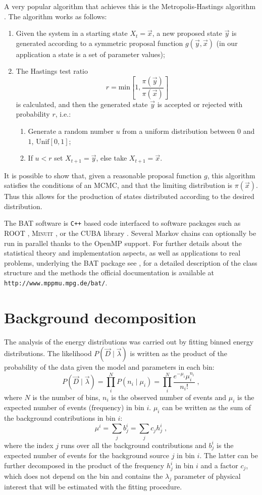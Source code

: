 A very popular algorithm that achieves this is the Metropolis-Hastings algorithm \cite{Metropolis,Hastings}. The algorithm works as follows:
\begin{enumerate}
	\item Given the system in a starting state $X_t=\vec{x}$, a new proposed state $\vec{y}$ is generated according to a symmetric proposal function $g(\vec{y},\vec{x})$ (in our application a state is a set of parameter values);
	\item The Hastings test ratio
		\[r=\text{min}\left[1,\frac{\pi(\vec{y})}{\pi(\vec{x})}\right]\]
		is calculated, and then the generated state $\vec{y}$ is accepted or rejected with probability $r$, i.e.:
		\begin{enumerate}
			\item Generate a random number $u$ from a uniform distribution between $0$ and $1$, $\text{Unif}[0,1]$;
			\item If $u<r$ set $X_{t+1}=\vec{y}$, else take $X_{t+1}=\vec{x}$.
		\end{enumerate}
\end{enumerate}
It is possible to show that, given a reasonable proposal function $g$, this algorithm satisfies the conditions of an MCMC, and that the limiting distribution is $\pi(\vec{x})$. Thus this allows for the production of states distributed according to the desired distribution.

 The BAT software is \texttt{C++} based code interfaced to software packages such as ROOT \cite{ROOT}, \textsc{Minuit} \cite{MINUIT}, or the CUBA library \cite{CUBA}. Several Markov chains can optionally be run in parallel thanks to the OpenMP \cite{openmp} support. For further details about the statistical theory and implementation aspects, as well as applications to real problems, underlying the BAT package see \cite{BAT}, for a detailed description of the class structure and the methods the official documentation is available at \texttt{http://www.mppmu.mpg.de/bat/}.

\section*{Background decomposition}
The analysis of the energy distributions was carried out by fitting binned energy distributions. The likelihood $P(\vec{D}\mid\vec{\lambda})$ is written as the product of the probability of the data given the model and parameters in each bin:
\[P(\vec{D}\mid\vec{\lambda})=\prod_i^{N}P(n_i\mid\mu_i)=\prod_i^N\frac{e^{-\mu_i}\mu_i^{n_i}}{n_i!}\;,\]
where $N$ is the number of bins, $n_i$ is the observed number of events and $\mu_i$ is the expected number of events (frequency) in bin $i$. $\mu_i$ can be written as the sum of the background contributions in bin $i$:
\[\mu^i=\sum_jb_j^i=\sum_j c_jh_j^i\;,\]
where the index $j$ runs over all the background contributions and $b_j^i$ is the expected number of events for the background source $j$ in bin $i$. The latter can be further decomposed in the product of the frequency $h_j^i$ in bin $i$ and a factor $c_j$, which does not depend on the bin and contains the $\lambda_j$ parameter of physical interest that will be estimated with the fitting procedure.

